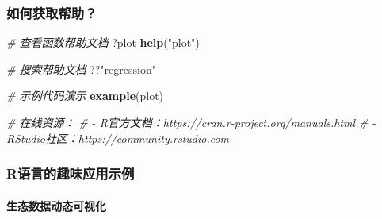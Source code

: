 \documentclass[
]{book}
\newenvironment{Shaded}{\begin{snugshade}}{\end{snugshade}}
\newcommand{\CommentTok}[1]{\textcolor[rgb]{0.56,0.35,0.01}{\textit{#1}}}
\newcommand{\FunctionTok}[1]{\textcolor[rgb]{0.13,0.29,0.53}{\textbf{#1}}}
\newcommand{\NormalTok}[1]{#1}
\newcommand{\StringTok}[1]{\textcolor[rgb]{0.31,0.60,0.02}{#1}}
\begin{document}
\hypertarget{ux5982ux4f55ux83b7ux53d6ux5e2eux52a9}{%
\subsubsection{如何获取帮助？}\label{ux5982ux4f55ux83b7ux53d6ux5e2eux52a9}}

\begin{Shaded}
\begin{Highlighting}[]
\CommentTok{\# 查看函数帮助文档}
\NormalTok{?plot}
\FunctionTok{help}\NormalTok{(}\StringTok{"plot"}\NormalTok{)}

\CommentTok{\# 搜索帮助文档}
\NormalTok{??}\StringTok{"regression"}

\CommentTok{\# 示例代码演示}
\FunctionTok{example}\NormalTok{(plot)}

\CommentTok{\# 在线资源：}
\CommentTok{\# {-} R官方文档：https://cran.r{-}project.org/manuals.html}
\CommentTok{\# {-} RStudio社区：https://community.rstudio.com}
\end{Highlighting}
\end{Shaded}

\hypertarget{rux8bedux8a00ux7684ux8da3ux5473ux5e94ux7528ux793aux4f8b}{%
\subsubsection{R语言的趣味应用示例}\label{rux8bedux8a00ux7684ux8da3ux5473ux5e94ux7528ux793aux4f8b}}

\hypertarget{ux751fux6001ux6570ux636eux52a8ux6001ux53efux89c6ux5316}{%
\paragraph{生态数据动态可视化}\label{ux751fux6001ux6570ux636eux52a8ux6001ux53efux89c6ux5316}}
\end{document}
